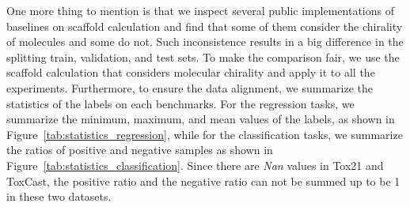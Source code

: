 \documentclass{article}
\begin{document}
\begin{table}[h]
  \caption{The performance of classification datasets under random scaffold splitting}
  \centering
  \small
  \setlength{}
  \label{tab:overall_performance_random_scaffold}
  \vspace{-1.5em}
\end{table}

One more thing to mention is that we inspect several public implementations of baselines on scaffold calculation and find that some of them consider the chirality of molecules and some do not. Such inconsistence results in a big difference in the splitting train, validation, and test sets. To make the comparison fair, we use the scaffold calculation that considers molecular chirality and apply it to all the experiments. Furthermore, to ensure the data alignment, we summarize the statistics of the labels on each benchmarks. For the regression tasks, we summarize the minimum, maximum, and mean values of the labels, as shown in Figure~\ref{tab:statistics_regression}, while for the classification tasks, we summarize the ratios of positive and negative samples as shown in Figure~\ref{tab:statistics_classification}. Since there are \textit{Nan} values in Tox21 and ToxCast, the positive ratio and the negative ratio can not be summed up to be 1 in these two datasets.
\end{document}
